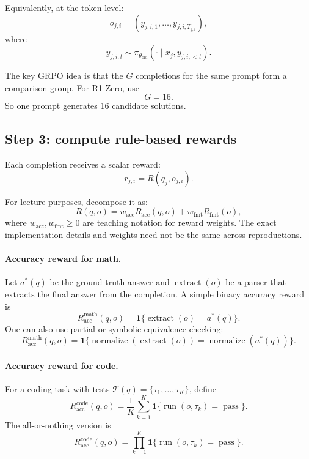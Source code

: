 \documentclass[11pt]{article}
\newcommand{\ind}{\mathbf{1}}
\newcommand{\old}{\mathrm{old}}
\newcommand{\fmt}{\mathrm{fmt}}
\newcommand{\acc}{\mathrm{acc}}
\begin{document}
Equivalently, at the token level:
\begin{equation}
 o_{j,i}=(y_{j,i,1},\ldots,y_{j,i,T_{j,i}}),
\end{equation}
where
\begin{equation}
 y_{j,i,t}\sim \pi_{\theta_{\old}}(\cdot\mid x_j,y_{j,i,<t}).
\end{equation}

The key GRPO idea is that the $G$ completions for the same prompt form a comparison group. For R1-Zero, use
\begin{equation}
G=16.
\end{equation}
So one prompt generates 16 candidate solutions.

\subsection{Step 3: compute rule-based rewards}

Each completion receives a scalar reward:
\begin{equation}
r_{j,i}=R(q_j,o_{j,i}).
\end{equation}

For lecture purposes, decompose it as:
\begin{equation}
R(q,o)=w_{\acc}R_{\acc}(q,o)+w_{\fmt}R_{\fmt}(o),
\label{eq:reward_decomp}
\end{equation}
where $w_{\acc},w_{\fmt}\ge 0$ are teaching notation for reward weights. The exact implementation details and weights need not be the same across reproductions.

\paragraph{Accuracy reward for math.}
Let $a^*(q)$ be the ground-truth answer and $\operatorname{extract}(o)$ be a parser that extracts the final answer from the completion. A simple binary accuracy reward is
\begin{equation}
R_{\acc}^{\mathrm{math}}(q,o)
=\ind\{\operatorname{extract}(o)=a^*(q)\}.
\end{equation}
One can also use partial or symbolic equivalence checking:
\begin{equation}
R_{\acc}^{\mathrm{math}}(q,o)
=\ind\{\operatorname{normalize}(\operatorname{extract}(o))
=\operatorname{normalize}(a^*(q))\}.
\end{equation}

\paragraph{Accuracy reward for code.}
For a coding task with tests $\mathcal{T}(q)=\{\tau_1,\ldots,\tau_K\}$, define
\begin{equation}
R_{\acc}^{\mathrm{code}}(q,o)
=\frac{1}{K}\sum_{k=1}^{K}\ind\{\operatorname{run}(o,\tau_k)=\operatorname{pass}\}.
\end{equation}
The all-or-nothing version is
\begin{equation}
R_{\acc}^{\mathrm{code}}(q,o)
=\prod_{k=1}^{K}\ind\{\operatorname{run}(o,\tau_k)=\operatorname{pass}\}.
\end{equation}
\end{document}
